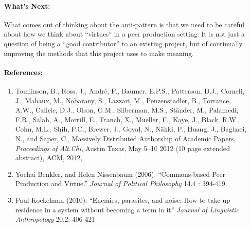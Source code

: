 \paragraph{What's Next:} What comes out of thinking about the anti-pattern
is that we need to be careful about how we think about ``virtues'' in a
peer production setting. It is not just a question of being a ``good
contributor'' to an existing project, but of continually improving the
methods that this project uses to make meaning.

\paragraph{References:}

\begin{enumerate}
\item
  Tomlinson, B., Ross, J., André, P., Baumer, E.P.S., Patterson, D.J.,
  Corneli, J., Mahaux, M., Nobarany, S., Lazzari, M., Penzenstadler, B.,
  Torrance, A.W., Callele, D.J., Olson, G.M., Silberman, M.S., Ständer,
  M., Palamedi, F.R., Salah, A., Morrill, E., Franch, X., Mueller, F.,
  Kaye, J., Black, R.W., Cohn, M.L., Shih, P.C., Brewer, J., Goyal, N.,
  Näkki, P., Huang, J., Baghaei, N., and Saper,
  C., \href{http://altchi.org/submissions/submission_wmt_0.pdf}{Massively
  Distributed Authorship of Academic Papers}, \emph{Proceedings of
  Alt.Chi}, Austin Texas, May 5--10 2012 (10 page extended abstract),
  ACM, 2012,
\item
  Yochai Benkler, and Helen Nissenbaum (2006). ``Commons-based Peer
  Production and Virtue.'' \emph{Journal of Political Philosophy} 14.4 :
  394-419.
\item
  Paul Kockelman (2010). ``Enemies, parasites, and noise: How to take up
  residence in a system without becoming a term in it'' \emph{Journal of
  Linguistic Anthropology} 20.2: 406-421
\end{enumerate}
